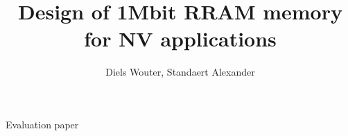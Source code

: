 \documentclass[journal]{IEEEtran}
\begin{document}
%
\title{Design of 1Mbit RRAM memory for NV applications}
%
%
%

\author{Diels Wouter, Standaert Alexander}%


% 
%



%
{Evaluation paper}
% 
\end{document}

